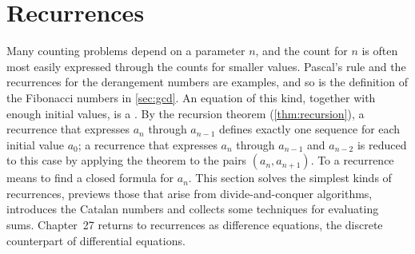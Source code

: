 \begin{figure}
\end{figure}

\section{Recurrences}
\label{sec:recurrences}

Many counting problems depend on a parameter $n$, and the count for $n$ is often most easily expressed through the counts for smaller values. Pascal's rule and the recurrences for the derangement numbers are examples, and so is the definition of the Fibonacci numbers in \cref{sec:gcd}. An equation of this kind, together with enough initial values, is a . By the recursion theorem (\cref{thm:recursion}), a recurrence that expresses $a_n$ through $a_{n-1}$ defines exactly one sequence for each initial value $a_0$; a recurrence that expresses $a_n$ through $a_{n-1}$ and $a_{n-2}$ is reduced to this case by applying the theorem to the pairs $(a_n,a_{n+1})$. To  a recurrence means to find a closed formula for $a_n$. This section solves the simplest kinds of recurrences, previews those that arise from divide-and-conquer algorithms, introduces the Catalan numbers and collects some techniques for evaluating sums. Chapter~27 returns to recurrences as difference equations, the discrete counterpart of differential equations.

